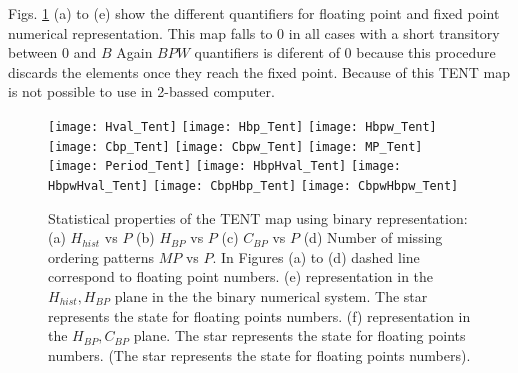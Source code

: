 Figs. \ref{fig:tent} (a) to (e) show the different quantifiers for floating point and fixed point numerical representation.
This map falls to $0$ in all cases with a short transitory between $0$ and $B$
Again $BPW$ quantifiers is diferent of $0$ because this procedure discards the elements once they reach the fixed point.
Because of this TENT map is not possible to use in 2-bassed computer.

\begin{figure}
	\texttt{[image: Hval\_Tent]}
	\texttt{[image: Hbp\_Tent]}
	\texttt{[image: Hbpw\_Tent]}
	\texttt{[image: Cbp\_Tent]}
	\texttt{[image: Cbpw\_Tent]}
	\texttt{[image: MP\_Tent]}
	\texttt{[image: Period\_Tent]}
	\texttt{[image: HbpHval\_Tent]}
	\texttt{[image: HbpwHval\_Tent]}
	\texttt{[image: CbpHbp\_Tent]}
	\texttt{[image: CbpwHbpw\_Tent]}
	\caption{Statistical properties of the TENT map using binary representation: (a) $H_{hist}$ vs $P$ (b) $H_{BP}$ vs $P$ (c) $C_{BP}$ vs $P$ (d) Number of missing ordering patterns $MP$ vs $P$. In Figures (a) to (d) dashed line correspond to floating point numbers. (e) representation in the $H_{hist},H_{BP}$ plane in the the binary numerical system.  The star represents the state for floating points numbers. (f) representation in the $H_{BP},C_{BP}$ plane.  The star represents the state for floating points numbers. (The star represents the state for floating points numbers). } \label{fig:tent}
\end{figure}
